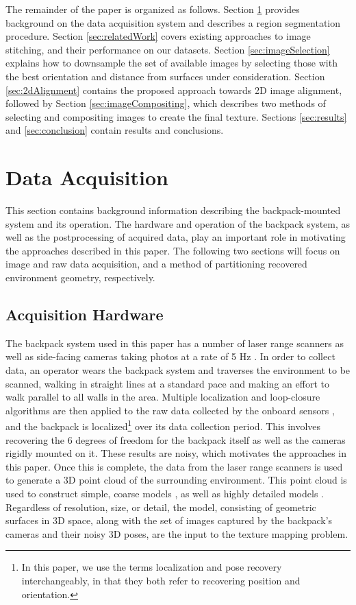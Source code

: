 \documentclass[]{spie}  %
\begin{document}
The remainder of the paper is organized as follows. Section
\ref{sec:dataAcquisition} provides background on the data acquisition
system and describes a region segmentation procedure. Section
\ref{sec:relatedWork} covers existing approaches to image stitching,
and their performance on our datasets. Section
\ref{sec:imageSelection} explains how to downsample the set of
available images by selecting those with the best orientation and
distance from surfaces under consideration. Section
\ref{sec:2dAlignment} contains the proposed approach towards 2D image
alignment, followed by Section \ref{sec:imageCompositing}, which
describes two methods of selecting and compositing images to create
the final texture. Sections \ref{sec:results} and \ref{sec:conclusion}
contain results and conclusions.

\section{Data Acquisition}
\label{sec:dataAcquisition}

This section contains background information describing the
backpack-mounted system and its operation. The hardware and operation
of the backpack system, as well as the postprocessing of acquired
data, play an important role in motivating the approaches described in
this paper. The following two sections will focus on image and raw
data acquisition, and a method of partitioning recovered environment
geometry, respectively.

\subsection{Acquisition Hardware}

The backpack system used in this paper has a number of laser range
scanners as well as side-facing cameras taking photos at a rate of 5
Hz \cite{liu2010indoor}. In order to collect data, an operator wears
the backpack system and traverses the environment to be scanned,
walking in straight lines at a standard pace and making an effort to
walk parallel to all walls in the area. Multiple localization and
loop-closure algorithms are then applied to the raw data collected by
the onboard sensors \cite{chen2010indoor, kua2012loopclosure,
  liu2010indoor}, and the backpack is localized\footnote{In this
  paper, we use the terms localization and pose recovery
  interchangeably, in that they both refer to recovering position and
  orientation.}  over its data collection period. This involves
recovering the 6 degrees of freedom for the backpack itself as well as
the cameras rigidly mounted on it. These results are noisy, which
motivates the approaches in this paper. Once this is complete, the
data from the laser range scanners is used to generate a 3D point
cloud of the surrounding environment. This point cloud is used to
construct simple, coarse models \cite{sanchez2012point,
  turnerfloorplan}, as well as highly detailed models
\cite{turnerwatertight}.  Regardless of resolution, size, or detail,
the model, consisting of geometric surfaces in 3D space, along with
the set of images captured by the backpack's cameras and their noisy
3D poses, are the input to the texture mapping problem.
\end{document}
